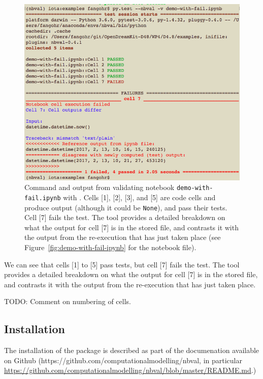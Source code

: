 \documentclass{deliverablereport}
\begin{document}
\begin{figure}[ht]
  \centering
  \includegraphics[width=1\textwidth]{examples/demo-with-fail-pytest.png}
  \caption{\nbval Command and output from validating notebook
    \texttt{demo-with-fail.ipynb} with \nbval. Cells [1], [2], [3],
    and [5] are code cells and produce output (although it could be
    \texttt{None}), and pass their tests. Cell [7] fails the test. The
    tool provides a detailed breakdown on what the output for cell [7]
    is in the stored file, and contrasts it with the output from the
    re-execution that has just taken place (see
    Figure~\ref{fig:demo-with-fail-ipynb} for the notebook
    file).\label{fig:demo-with-fail-pytest}}
\end{figure}

We can see that cells [1] to [5] pass tests, but cell [7] fails the test. The
    tool provides a detailed breakdown on what the output for cell [7]
    is in the stored file, and contrasts it with the output from the
    re-execution that has just taken place.

TODO: Comment on numbering of cells.

\clearpage
\subsection{Installation}\label{sec:installation}
The installation of the package is described as part of the
documenation available on Github
(https://github.com/computationalmodelling/nbval, in particular\linebreak
\href{https://github.com/computationalmodelling/nbval/blob/master/README.md}{https://github.com/computationalmodelling/nbval/blob/master/README.md}.)
\end{document}
